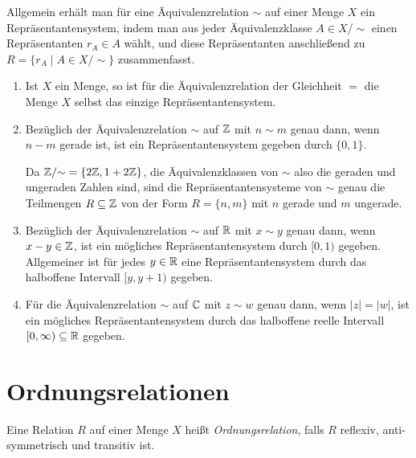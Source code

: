 \begin{bem}
 Allgemein erhält man für eine Äquivalenzrelation $\sim$ auf einer Menge $X$ ein Repräsentantensystem, indem man aus jeder Äquivalenzklasse $A \in X/{\sim}$ einen Repräsentanten $r_A \in A$ wählt, und diese Repräsentanten anschließend zu $R = \{r_A \mid A \in X/{\sim}\}$ zusammenfasst.
\end{bem}

\begin{bsp}
 \begin{enumerate}[leftmargin=*]
  \item
   Ist $X$ ein Menge, so ist für die Äquivalenzrelation der Gleichheit $=$ die Menge $X$ selbst das einzige Repräsentantensystem.
  \item
   Bezüglich der Äquivalenzrelation $\sim$ auf $\mathbb{Z}$ mit $n \sim m$ genau dann, wenn $n-m$ gerade ist, ist ein Repräsentantensystem gegeben durch $\{0,1\}$.
   
   Da $\mathbb{Z}/{\sim} = \{2\mathbb{Z}, 1+2\mathbb{Z}\}$, die Äquivalenzklassen von $\sim$ also die geraden und ungeraden Zahlen sind, sind die Repräsentantensysteme von $\sim$ genau die Teilmengen $R \subseteq \mathbb{Z}$ von der Form $R = \{n,m\}$ mit $n$ gerade und $m$ ungerade.
  \item
   Bezüglich der Äquivalenzrelation $\sim$ auf $\mathbb{R}$ mit $x \sim y$ genau dann, wenn $x-y \in \mathbb{Z}$, ist ein mögliches Repräsentantensystem durch $[0,1)$ gegeben. Allgemeiner ist für jedes $y \in \mathbb{R}$ eine Repräsentantensystem durch das halboffene Intervall $[y,y+1)$ gegeben.
  \item
   Für die Äquivalenzrelation $\sim$ auf $\mathbb{C}$ mit $z \sim w$ genau dann, wenn $|z| = |w|$, ist ein mögliches Repräsentantensystem durch das halboffene reelle Intervall $[0,\infty) \subseteq \mathbb{R}$ gegeben.
 \end{enumerate}
\end{bsp}




\section{Ordnungsrelationen}
\begin{defi}
 Eine Relation $R$ auf einer Menge $X$ heißt \emph{Ordnungsrelation}, falls $R$ reflexiv, anti-symmetrisch und transitiv ist.
\end{defi}

